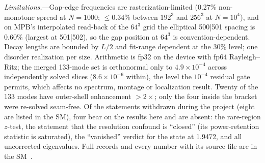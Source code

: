 \documentclass[prl,twocolumn,superscriptaddress,showpacs]{revtex4-2}
\begin{document}
\emph{Limitations.}---Gap-edge frequencies are rasterization-limited (0.27\% non-monotone spread at $N=1000$; $\le0.34\%$ between $192^3$ and $256^3$ at $N=10^4$), and on MPB's interpolated read-back of the $64^3$ grid the elliptical 500|501 spacing is 0.60\% (largest at 501|502), so the gap position at $64^3$ is convention-dependent. Decay lengths are bounded by $L/2$ and fit-range dependent at the 30\% level; one disorder realization per size. Arithmetic is fp32 on the device with fp64 Rayleigh--Ritz; the merged 133-mode set is orthonormal only to $4.9\times10^{-4}$ across independently solved slices ($8.6\times10^{-6}$ within), the level the $10^{-4}$ residual gate permits, which affects no spectrum, montage or localization result. Twenty of the 133 modes have outer-shell enhancement $>2\times$; only the four inside the bracket were re-solved seam-free. Of the statements withdrawn during the project (eight are listed in the SM), four bear on the results here and are absent: the rare-region $z$-test, the statement that the resolution confound is ``closed'' (its power-retention statistic is saturated), the ``vanished'' verdict for the state at 1.9472, and all uncorrected eigenvalues. Full records and every number with its source file are in the SM~\cite{SM}.



\end{document}

